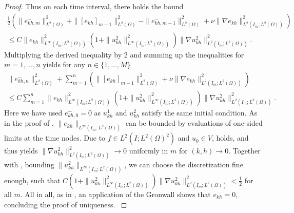 \documentclass[10pt,a4paper]{amsart}
\newcommand{\ekh}{e_{kh}}
\newcommand{\ukh}{u_{kh}}
\begin{document}
\begin{proof}
{  Thus on each time interval, there holds the bound
  \begin{align*}
    \frac{1}{2} \left(\|e_{kh,m}^-\|_{L^2(\Omega)}^2  
    + \|[\ekh]_{m-1}\|_{L^2(\Omega)}^2 - \|e_{kh,m-1}^-\|_{L^2(\Omega)}^2 
    + \nu\|\nabla \ekh\|_{L^2(I_m;L^2(\Omega))}^2\right)\\
    \le C \|\ekh\|_{L^\infty(I_m;L^2(\Omega))}^2 \left(1 + \|\ukh^2\|_{L^\infty(I_m;L^2(\Omega))}^2\right)
    \| \nabla \ukh^2\|_{L^2(I_m;L^2(\Omega))}^2.
  \end{align*}
  Multiplying the derived inequality by 2 and summing up the inequalities for $m=1,...,n$ yields 
  for any $n \in \{1,...,M\}$
  \begin{align*}
    \|e_{kh,n}^-\|_{L^2(\Omega)}^2 + \sum_{m=1}^n 
    \left(\|[\ekh]_{m-1}\|_{L^2(\Omega)}^2 + \nu \|\nabla \ekh\|_{L^2(I_m;L^2(\Omega))}^2\right)\\
    \le 
    C \sum_{m=1}^n \|\ekh\|_{L^\infty(I_m;L^2(\Omega))}^2 
    \left(1 + \|\ukh^2\|_{L^\infty(I_m;L^2(\Omega))}^2\right) 
    \| \nabla \ukh^2\|_{L^2(I_m;L^2(\Omega))}^2.
  \end{align*}
  Here we have used $e_{kh,0}^- = 0$ as $u_{kh}^1$ and $u_{kh}^2$ satisfy the same initial condition.
  As in the proof of , 
  $\|\ekh\|_{L^\infty(I_m;L^2(\Omega))}$ can be bounded by evaluations of one-sided limits at the time nodes.
  Due to $f \in L^2(I;L^2(\Omega)^2)$ and $u_0 \in V$,  holds,
  and thus  yields $\| \nabla \ukh^2\|_{L^2(I_m;L^2(\Omega))}^2 \to 0$
  uniformly in $m$ for $(k,h)\to 0$. Together with , bounding 
  $\|\ukh^2\|_{L^\infty(I_m;L^2(\Omega))}$, we can choose the discretization fine enough, such that
  $C (1 + \|\ukh^2\|_{L^\infty(I_m;L^2(\Omega))}^2)\| \nabla \ukh^2\|_{L^2(I_m;L^2(\Omega))}^2< \frac{1}{2}$
  for all $m$.
  All in all, as in , an application of 
  the Gronwall  shows that $\ekh = 0$,
  concluding the proof of uniqueness.
  }
  \end{proof}
\end{document}
